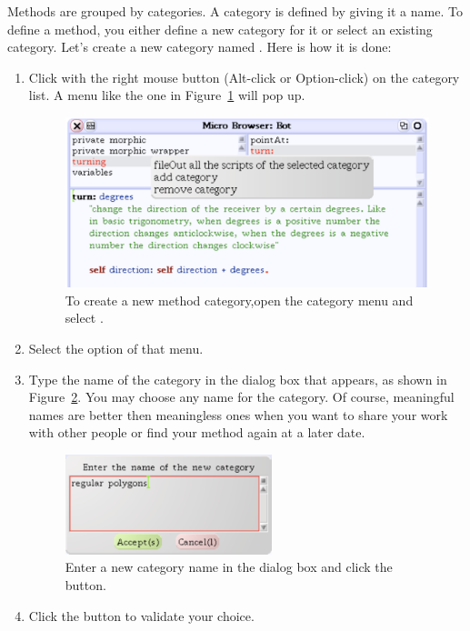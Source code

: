 \documentclass[a4paper,10pt,twoside]{book}
\begin{document}
Methods are grouped by categories. A category is defined by giving it a name. To define a 
method, you either define a new category for it or select an existing category. Let’s create a 
new category named . Here is how it is done: 

\begin{enumerate}
	\item Click with the right mouse button (Alt-click or Option-click) on the category list. 
A menu like the one in Figure~\ref{fig:122} will pop up.

\begin{figure}[ht]
	\centerline{\includegraphics[width=0.95\linewidth]{tbTwo}}
	\caption{To create a new method category,open the category menu and select 
. \label{fig:122}}
\end{figure}

\item Select the option  of that menu. 

\item  Type the name of the category in the dialog box that appears, as shown in Figure~\ref{fig:123}. 
You may choose any name for the category. Of course, meaningful names are better 
then meaningless ones when you want to share your work with other people or find 
your method again at a later date.

\begin{figure}[ht]
	\centerline{\includegraphics[width=6cm]{tbThree}}
	\caption{Enter a new category name in the dialog box and click the  button. \label{fig:123}}
\end{figure}

\item Click the  button to validate your choice.

\end{enumerate}
\end{document}
